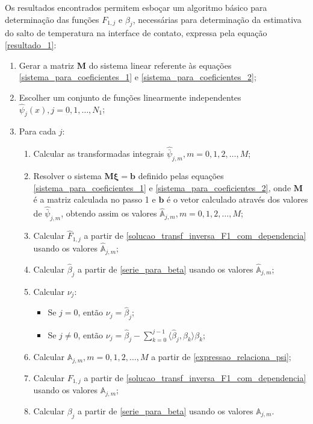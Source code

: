 Os resultados encontrados permitem esboçar um algoritmo básico para determinação das funções $F_{1,j}$ e $\beta_j$, necessárias para determinação da estimativa do salto de temperatura na interface de contato, expressa pela equação \eqref{resultado_1}:
\begin{enumerate}
	\item Gerar a matriz $\mathbf{M}$ do sistema linear referente às equações \eqref{sistema_para_coeficientes_1} e \eqref{sistema_para_coeficientes_2};
	\item Escolher um conjunto de funções linearmente independentes $\hat{\psi}_j(x), j=0,1,\ldots,N_1$;
	\item Para cada $j$:
	\begin{enumerate}	
		\item Calcular as transformadas integrais $\hat{\bar{\psi}}_{j,m}, m=0,1,2, \ldots, M$;
		\item Resolver o sistema $\mathbf{M}\mathbf{\xi} = \mathbf{b}$ definido pelas equações \eqref{sistema_para_coeficientes_1} e \eqref{sistema_para_coeficientes_2}, onde $\mathbf{M}$ é a matriz calculada no passo 1 e $\mathbf{b}$ é o vetor calculado através dos valores de $\hat{\bar{\psi}}_{j,m}$, obtendo assim os valores $\hat{\mathbb{A}}_{j,m}, m=0,1,2, \ldots, M$;
		\item Calcular $\hat{F}_{1,j}$ a partir de \eqref{solucao_transf_inversa_F1_com_dependencia} usando os valores $\hat{\mathbb{A}}_{j,m}$;
		\item Calcular $\hat{\beta}_j$ a partir de \eqref{serie_para_beta} usando os valores $\hat{\mathbb{A}}_{j,m}$;
		\item Calcular $\nu_j$:
		\begin{itemize}
			\item Se $j = 0$, então $\nu_j = \hat{\beta}_j$;
			\item Se $j \ne 0$, então $\nu_j = \hat{\beta}_j - \displaystyle\sum_{k = 0}^{j - 1} \langle \hat{\beta}_j, \beta_k\rangle\beta_k$;
		\end{itemize}
		\item Calcular $\mathbb{A}_{j,m}, m=0,1,2, \ldots, M$ a partir de \eqref{expressao_relaciona_psi};
		\item Calcular $F_{1,j}$ a partir de \eqref{solucao_transf_inversa_F1_com_dependencia} usando os valores $\mathbb{A}_{j,m}$;
		\item Calcular $\beta_j$ a partir de \eqref{serie_para_beta} usando os valores $\mathbb{A}_{j,m}$.
	\end{enumerate}
\end{enumerate}


